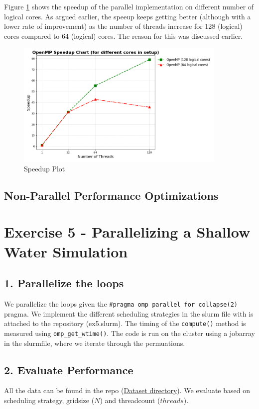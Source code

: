 \documentclass[a4paper,10pt]{article}
\begin{document}
Figure \ref{fig:ex4_speedup} shows the speedup of the parallel implementation on different number of logical cores. As argued earlier, the speeup keeps getting better (although with a lower rate of improvement) as the number of threads increase for 128 (logical) cores compared to 64 (logical) cores. The reason for this was discussed earlier.
\begin{figure}[H]
  \centering
  \includegraphics[width=0.9\textwidth]{img/ex4/speedup_plot.png}
  \caption{Speedup Plot}
  \label{fig:ex4_speedup}
\end{figure}



\subsection{Non-Parallel Performance Optimizations}

\section{Exercise 5 - Parallelizing a Shallow Water Simulation}
\subsection{1. Parallelize the loops}
We parallelize the loops given the \verb|#pragma omp parallel for collapse(2)| pragma. 
We implement the different scheduling strategies in the slurm file with is attached to the repository (ex5.slurm).
The timing of the \verb|compute()| method is measured using \verb|omp_get_wtime()|.
The code is run on the cluster using a jobarray in the slurmfile, where we iterate through the permuations.

\subsection{2. Evaluate Performance}
All the data can be found in the repo (\href{https://github.com/paulmyr/DD2356-MethodsHPC/tree/master/3_open_mp/exercise5/data}{Dataset directory}).
We evaluate based on scheduling strategy, gridsize ($N$) and threadcount ($threads$).
\end{document}
